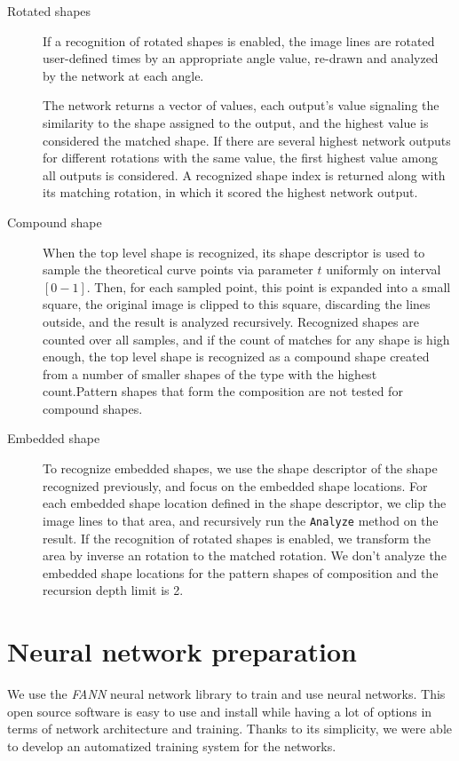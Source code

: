\begin{description}
\item [Rotated shapes] If a recognition of rotated shapes is enabled, the image lines are rotated user-defined times by an appropriate angle value, re-drawn and analyzed by the network at each angle. 

The network returns a vector of values, each output's value signaling the similarity to the shape assigned to the output, and the highest value is considered the matched shape. If there are several highest network outputs for different rotations with the same value, the first highest value among all outputs is considered. A recognized shape index is returned along with its matching rotation, in which it scored the highest network output.

\item[Compound shape]
When the top level shape is recognized, its shape descriptor is used to sample the theoretical curve points via parameter $t$ uniformly on interval $[0-1]$. Then, for each sampled point, this point is expanded into a small square, the original image is clipped to this square, discarding the lines outside, and the result is analyzed recursively. Recognized shapes are counted over all samples, and if the count of matches for any shape is high enough, the top level shape is recognized as a compound shape created from a number of smaller shapes of the type with the highest count.Pattern shapes that form the composition are not tested for compound shapes.

\item [Embedded shape]
To recognize embedded shapes, we use the shape descriptor of the shape recognized previously, and focus on the embedded shape locations. For each embedded shape location defined in the shape descriptor, we clip the image lines to that area, and recursively run the \texttt{Analyze} method on the result. If the recognition of rotated shapes is enabled, we transform the area by inverse an rotation to the matched rotation. We don't analyze the embedded shape locations for the pattern shapes of composition and the recursion depth limit is 2. 

\end{description}

\section{Neural network preparation}
We use the \emph{FANN} neural network library to train and use neural networks. This open source software is easy to use and install while having a lot of options in terms of network architecture and training. Thanks to its simplicity, we were able to develop an automatized training system for the networks.

